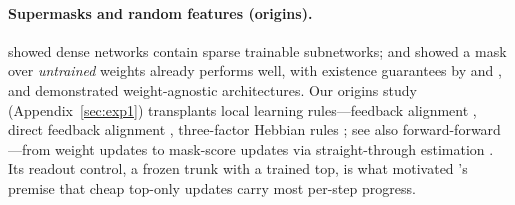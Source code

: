 \paragraph{Supermasks and random features (origins).} \citet{frankle2019lottery}
showed dense networks contain sparse trainable subnetworks;
\citet{zhou2019deconstructing} and \citet{ramanujan2020whats} showed a mask
over \emph{untrained} weights already performs well, with existence
guarantees by \citet{malach2020proving} and \citet{pensia2020optimal}, and
\citet{gaier2019weight} demonstrated weight-agnostic architectures. Our
origins study (Appendix~\ref{sec:exp1}) transplants local learning
rules---feedback alignment \citep{lillicrap2016random}, direct feedback
alignment \citep{nokland2016direct}, three-factor Hebbian rules
\citep{fremaux2016neuromodulated, williams1992simple}; see also
forward-forward \citep{hinton2022forward}---from weight updates to
mask-score updates via straight-through estimation
\citep{bengio2013estimating}. Its readout control, a frozen trunk with a
trained top, is what motivated \fw{}'s premise that cheap top-only updates
carry most per-step progress.
